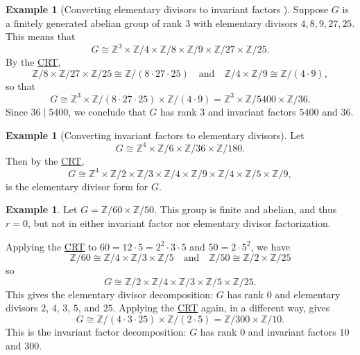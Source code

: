 \documentclass[12pt]{report}
\numberwithin{equation}{section}
\numberwithin{theorem}{chapter}
\theoremstyle{definition}
\newtheorem{example}[theorem]{Example}
\newtheorem*{basic properties}{Basic Properties}
\newtheorem*{Important Remark}{Important Remark}
\begin{document}
\begin{example}[{Converting elementary divisors to invariant factors} ]
Suppose $G$ is a finitely generated abelian group of rank $3$ with elementary divisors $4, 8, 9, 27, 25$. This means that
$$G \cong \mathbb{Z}^{3} \times \mathbb{Z}/4 \times \mathbb{Z}/8 \times \mathbb{Z}/9 \times \mathbb{Z}/27 \times \mathbb{Z}/25.$$
By the \hyperref[CRT]{CRT}, 
$$\mathbb{Z}/8 \times \mathbb{Z}/27 \times \mathbb{Z}/25 \cong \mathbb{Z}/(8 \cdot 27 \cdot 25)
\quad \text{and} \quad
\mathbb{Z}/4\times \mathbb{Z}/9  \cong \mathbb{Z}/(4 \cdot 9),$$
so that
$$G \cong \mathbb{Z}^{3} \times \mathbb{Z}/(8 \cdot 27 \cdot 25) \times \mathbb{Z}/(4 \cdot 9) = \mathbb{Z}^{3} \times \mathbb{Z}/5400 \times \mathbb{Z}/36.$$
Since $36 \mid 5400$, we conclude that $G$ has rank $3$ and invariant factors $5400$ and $36$. 
\end{example}


\begin{example}[Converting invariant factors to elementary divisors]
Let
$$G \cong \mathbb{Z}^{4} \times \mathbb{Z}/6 \times \mathbb{Z}/36 \times \mathbb{Z}/180.$$
Then by the \hyperref[CRT]{CRT},
$$G \cong \mathbb{Z}^{4} \times \mathbb{Z}/2 \times \mathbb{Z}/3 \times \mathbb{Z}/4 \times \mathbb{Z}/9  \times \mathbb{Z}/4 \times \mathbb{Z}/5 \times \mathbb{Z}/9,$$
is the elementary divisor form for $G$.
\end{example}



\begin{example} 
Let $G = \mathbb{Z}/60 \times \mathbb{Z}/50$. This group is finite and abelian, and thus $r=0$, but not in either invariant factor nor elementary divisor factorization.

Applying the \hyperref[CRT]{CRT} to $60 = 12 \cdot 5 = 2^2 \cdot 3 \cdot 5$ and $50 = 2 \cdot 5^2$, we have
$$\mathbb{Z} / 60 \cong \mathbb{Z} / 4 \times \mathbb{Z} / 3 \times \mathbb{Z} / 5 \quad \text{and} \quad \mathbb{Z}/50 \cong \mathbb{Z}/2 \times \mathbb{Z}/25$$
so
$$G \cong \mathbb{Z}/2 \times \mathbb{Z}/4 \times \mathbb{Z}/3 \times \mathbb{Z}/5 \times \mathbb{Z}/25.$$
This gives the elementary divisor decomposition: $G$ has rank $0$ and elementary divisors $2$, $4$, $3$, $5$, and $25$. Applying the \hyperref[CRT]{CRT} again, in a different way, gives
$$G \cong \mathbb{Z}/(4 \cdot 3 \cdot 25) \times \mathbb{Z}/(2 \cdot 5) = \mathbb{Z}/300 \times \mathbb{Z}/10.$$
This is the invariant factor decomposition: $G$ has rank $0$ and invariant factors $10$ and $300$.
\end{example}
\end{document}
